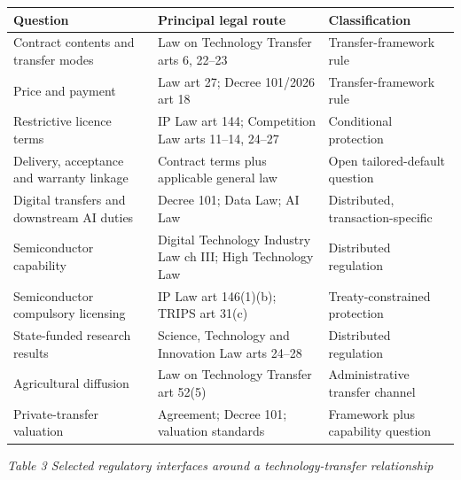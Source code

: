 \documentclass[
]{article}
\newcounter{none} %
\begin{document}
{\def\LTcaptype{none} %
\begin{longtable}[]{@{}
  >{\raggedright\arraybackslash}p{}
  >{\raggedright\arraybackslash}p{}
  >{\raggedright\arraybackslash}p{}@{}}
\toprule\noalign{}
\begin{minipage}[b]{\linewidth}\centering
\textbf{Question}
\end{minipage} & \begin{minipage}[b]{\linewidth}\centering
\textbf{Principal legal route}
\end{minipage} & \begin{minipage}[b]{\linewidth}\centering
\textbf{Classification}
\end{minipage} \\
\midrule\noalign{}
\endhead
\bottomrule\noalign{}
\endlastfoot
Contract contents and transfer modes & Law on Technology Transfer arts
6, 22--23 & Transfer-framework rule \\
Price and payment & Law art 27; Decree 101/2026 art 18 &
Transfer-framework rule \\
Restrictive licence terms & IP Law art 144; Competition Law arts 11--14,
24--27 & Conditional protection \\
Delivery, acceptance and warranty linkage & Contract terms plus
applicable general law & Open tailored-default question \\
Digital transfers and downstream AI duties & Decree 101; Data Law; AI
Law & Distributed, transaction-specific \\
Semiconductor capability & Digital Technology Industry Law ch III; High
Technology Law & Distributed regulation \\
Semiconductor compulsory licensing & IP Law art 146(1)(b); TRIPS art
31(c) & Treaty-constrained protection \\
State-funded research results & Science, Technology and Innovation Law
arts 24--28 & Distributed regulation \\
Agricultural diffusion & Law on Technology Transfer art 52(5) &
Administrative transfer channel \\
Private-transfer valuation & Agreement; Decree 101; valuation standards
& Framework plus capability question \\
\end{longtable}
}

\emph{Table 3 Selected regulatory interfaces around a
technology-transfer relationship}
\end{document}
